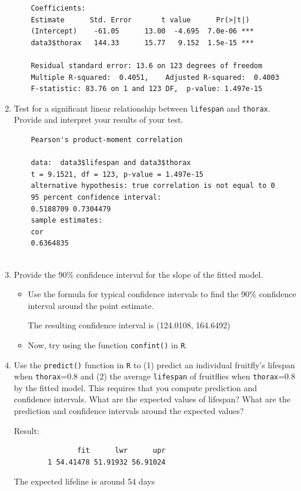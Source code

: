 \documentclass[12pt,letterpaper]{article}
\begin{document}
\begin{enumerate}
	
	\begin{Verbatim}
	Coefficients:
	Estimate      Std. Error       t value      Pr(>|t|)    
	(Intercept)    -61.05      13.00  -4.695  7.0e-06 ***
	data3$thorax   144.33      15.77   9.152  1.5e-15 ***
	
	Residual standard error: 13.6 on 123 degrees of freedom
	Multiple R-squared:  0.4051,	Adjusted R-squared:  0.4003 
	F-statistic: 83.76 on 1 and 123 DF,  p-value: 1.497e-15	
	\end{Verbatim}
			\vspace{.5cm}
	\item
	Test for a significant linear relationship between  \texttt{lifespan} and \texttt{thorax}. Provide and interpret your results of your test.
	\begin{Verbatim}
	Pearson's product-moment correlation
	
	data:  data3$lifespan and data3$thorax
	t = 9.1521, df = 123, p-value = 1.497e-15
	alternative hypothesis: true correlation is not equal to 0
	95 percent confidence interval:
	0.5188709 0.7304479
	sample estimates:
	cor 
	0.6364835 
	
	\end{Verbatim}
	
\newpage
	\item
	
	Provide the 90\% confidence interval for the slope of the fitted model.
	
			\vspace{.5cm}
	\begin{itemize}
		\item
		Use the formula for typical confidence intervals to find the 90\% confidence interval around the point estimate.		
		
		The resulting confidence interval is (124.0108, 164.6492)
		\vspace{.5cm}
		\item
		Now, try using the function  \texttt{confint()}  in \texttt{R}.
				
	\end{itemize}
			\vspace{1cm}
	\item Use the \texttt{predict()} function in \texttt{R} to (1) predict an individual fruitfly's lifespan when \texttt{thorax}=0.8 and (2) the average \texttt{lifespan} of fruitflies when \texttt{thorax}=0.8 by the fitted model. This requires that you compute prediction and confidence intervals. What are the expected values of lifespan? What are the prediction and confidence intervals around the expected values? 
		
		Result:
	\begin{Verbatim}
		       fit      lwr      upr
		1 54.41478 51.91932 56.91024
	\end{Verbatim}
	The expected lifeline is around 54 days
	\vspace{.5cm}
			

\end{enumerate}
\end{document}
